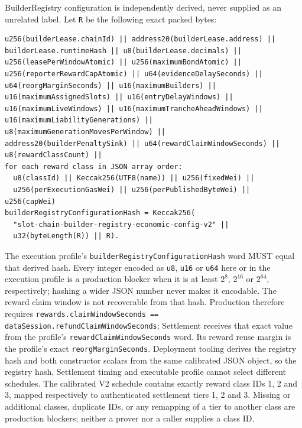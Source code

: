 \documentclass[a4paper,11pt]{article}
\newcommand{\code}[1]{\nolinkurl{#1}}
\begin{document}
BuilderRegistry configuration is independently derived, never supplied as an
unrelated label.  Let \code{R} be the following exact packed bytes:
\begin{verbatim}
u256(builderLease.chainId) || address20(builderLease.address) ||
builderLease.runtimeHash || u8(builderLease.decimals) ||
u256(leasePerWindowAtomic) || u256(maximumBondAtomic) ||
u256(reporterRewardCapAtomic) || u64(evidenceDelaySeconds) ||
u64(reorgMarginSeconds) || u16(maximumBuilders) ||
u16(maximumAssignedSlots) || u16(entryDelayWindows) ||
u16(maximumLiveWindows) || u16(maximumTrancheAheadWindows) ||
u16(maximumLiabilityGenerations) ||
u8(maximumGenerationMovesPerWindow) ||
address20(builderPenaltySink) || u64(rewardClaimWindowSeconds) ||
u8(rewardClassCount) ||
for each reward class in JSON array order:
  u8(classId) || Keccak256(UTF8(name)) || u256(fixedWei) ||
  u256(perExecutionGasWei) || u256(perPublishedByteWei) || u256(capWei)
builderRegistryConfigurationHash = Keccak256(
  "slot-chain-builder-registry-economic-config-v2" ||
  u32(byteLength(R)) || R).
\end{verbatim}
The execution profile's \code{builderRegistryConfigurationHash} word MUST
equal that derived hash.  Every integer encoded
as \code{u8}, \code{u16} or \code{u64} here or in the execution profile is a
production blocker when it is at least \(2^{8}\), \(2^{16}\) or \(2^{64}\),
respectively; hashing a wider JSON number never makes it encodable.
The reward claim window is not recoverable from that hash.  Production therefore
requires \code{rewards.claimWindowSeconds ==
dataSession.refundClaimWindowSeconds}; Settlement receives that exact value from
the profile's \code{rewardClaimWindowSeconds} word.  Its reward reuse margin is
the profile's exact \code{reorgMarginSeconds}.  Deployment tooling derives the
registry hash and both constructor scalars from the same calibrated JSON
object, so the registry hash, Settlement timing and executable profile cannot
select different schedules.
The calibrated V2 schedule contains exactly reward class IDs 1, 2 and 3,
mapped respectively to authenticated settlement tiers 1, 2 and 3.  Missing or
additional classes, duplicate IDs, or any remapping of a tier to another class
are production blockers; neither a prover nor a caller supplies a class ID.
\end{document}
